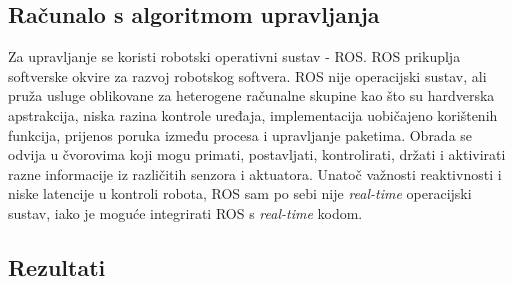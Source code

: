\documentclass[times, utf8, diplomski]{fer}
\begin{document}
\subsection{Računalo s algoritmom upravljanja}\label{sec:algoritam}
Za upravljanje se koristi robotski operativni sustav - ROS. ROS prikuplja softverske okvire za razvoj robotskog softvera. ROS nije operacijski sustav, ali pruža usluge oblikovane za heterogene računalne skupine kao što su hardverska apstrakcija, niska razina kontrole uređaja, implementacija uobičajeno korištenih funkcija, prijenos poruka između procesa i upravljanje paketima. Obrada se odvija u čvorovima  koji mogu primati, postavljati, kontrolirati,  držati i aktivirati razne informacije iz različitih senzora i aktuatora. Unatoč važnosti reaktivnosti i niske latencije u kontroli robota, ROS sam po sebi nije \emph{real-time} operacijski sustav, iako je moguće integrirati ROS s \emph{real-time} kodom. 

\subsection{Rezultati}
 
\end{document}
